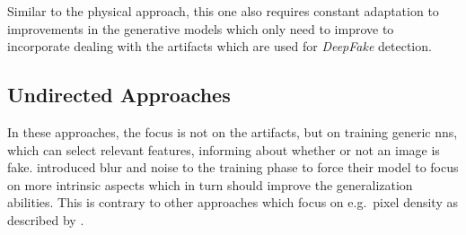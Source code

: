 \par
Similar to the physical approach, this one also requires constant adaptation to
improvements in the generative models which only need to improve to incorporate
dealing with the artifacts which are used for \textit{DeepFake} detection\cite{Mirsky.2020}.

\subsection{Undirected Approaches}
In these approaches, the focus is not on the artifacts, but on training generic
\glspl{nn}, which can select relevant features, informing about whether or not
an image is fake.
\textcite{xuan_generalization_2019} introduced blur and noise to the training phase
to force their model to focus on more intrinsic aspects which in turn should improve
the generalization abilities.
This is contrary to other approaches which focus on e.g.\ pixel density as
described by \textcite{Mirsky.2020}.
